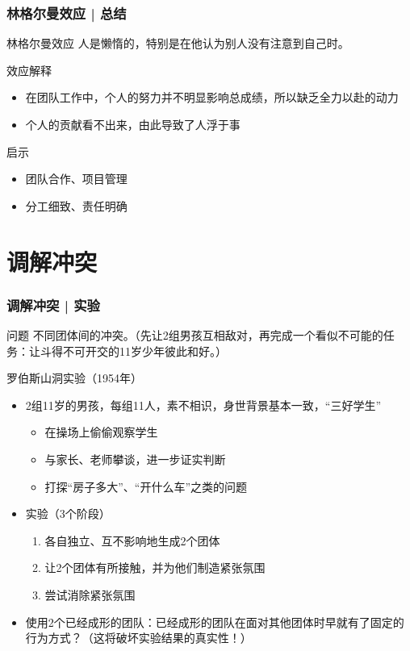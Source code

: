 \begin{frame}
  \frametitle{林格尔曼效应 | \alert{总结}}
  \begin{block}{林格尔曼效应}
    人是懒惰的，特别是在他认为别人没有注意到自己时。
  \end{block}
  \pause
  \begin{block}{效应解释}
    \begin{itemize}
      \item 在团队工作中，个人的努力并不明显影响总成绩，所以缺乏全力以赴的动力
      \item 个人的贡献看不出来，由此导致了人浮于事
    \end{itemize}
  \end{block}
  \pause
  \begin{block}{启示}
    \begin{itemize}
      \item 团队合作、项目管理
      \item 分工细致、责任明确
    \end{itemize}
  \end{block}
\end{frame}

\section{调解冲突}
\begin{frame}
  \frametitle{调解冲突 | 实验}
  \begin{block}{问题}
    不同团体间的冲突。（先让2组男孩互相敌对，再完成一个看似不可能的任务：让斗得不可开交的11岁少年彼此和好。）
  \end{block}
  \pause
  \begin{block}{罗伯斯山洞实验（1954年）}
    \begin{itemize}
      \item 2组11岁的男孩，每组11人，素不相识，身世背景基本一致，“三好学生”
        \begin{itemize}
          \item 在操场上偷偷观察学生
          \item 与家长、老师攀谈，进一步证实判断
          \item 打探“房子多大”、“开什么车”之类的问题
        \end{itemize}
      \item 实验（3个阶段）
        \begin{enumerate}
          \item 各自独立、互不影响地生成2个团体
          \item 让2个团体有所接触，并为他们制造紧张氛围
          \item 尝试消除紧张氛围
        \end{enumerate}
      \item 使用2个已经成形的团队：已经成形的团队在面对其他团体时早就有了固定的行为方式？（这将破坏实验结果的真实性！）
    \end{itemize}
  \end{block}
\end{frame}

